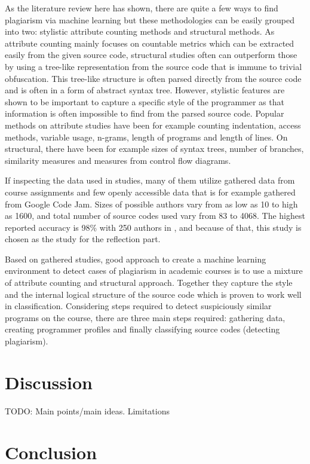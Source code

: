 \documentclass[english]{tktltiki2}
\theoremstyle{definition}
\theoremstyle{remark}
\begin{document}
As the literature review here has shown, there are quite a few ways to find plagiarism via machine learning but these methodologies can be easily grouped into two: stylistic attribute counting methods and structural methods. As attribute counting mainly focuses on countable metrics which can be extracted easily from the given source code, structural studies often can outperform those by using a tree-like representation from the source code that is immune to trivial obfuscation. This tree-like structure is often parsed directly from the source code and is often in a form of abstract syntax tree. However, stylistic features are shown to be important to capture a specific style of the programmer as that information is often impossible to find from the parsed source code. Popular methods on attribute studies have been for example counting indentation, access methods, variable usage, n-grams, length of programs and length of lines. On structural, there have been for example sizes of syntax trees, number of branches, similarity measures and measures from control flow diagrams. 

If inspecting the data used in studies, many of them utilize gathered data from course assignments and few openly accessible data that is for example gathered from Google Code Jam. Sizes of possible authors vary from as low as 10 to high as 1600, and total number of source codes used vary from 83 to 4068. The highest reported accuracy is 98\% with 250 authors in \cite{caliskan2015anonymizing}, and because of that, this study is chosen as the study for the reflection part. 

Based on gathered studies, good approach to create a machine learning environment to detect cases of plagiarism in academic courses is to use a mixture of attribute counting and structural approach. Together they capture the style and the internal logical structure of the source code which is proven to work well in classification. Considering steps required to detect suspiciously similar programs on the course, there are three main steps required: gathering data, creating programmer profiles and finally classifying source codes (detecting plagiarism).   


\section{Discussion}

TODO: Main points/main ideas. Limitations

\section{Conclusion}
\end{document}
